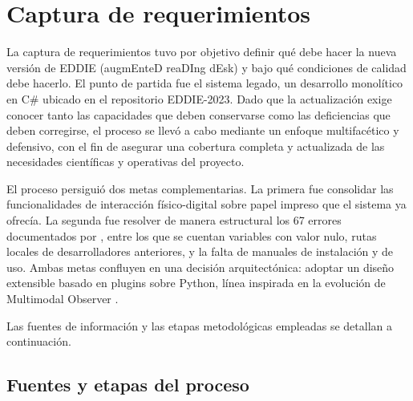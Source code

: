 \section{Captura de requerimientos}

La captura de requerimientos tuvo por objetivo definir qué debe hacer la nueva versión de EDDIE (augmEnteD reaDIng dEsk) y bajo qué condiciones de calidad debe hacerlo. El punto de partida fue el sistema legado, un desarrollo monolítico en C\# ubicado en el repositorio EDDIE-2023. Dado que la actualización exige conocer tanto las capacidades que deben conservarse como las deficiencias que deben corregirse, el proceso se llevó a cabo mediante un enfoque multifacético y defensivo, con el fin de asegurar una cobertura completa y actualizada de las necesidades científicas y operativas del proyecto.
 
El proceso persiguió dos metas complementarias. La primera fue consolidar las funcionalidades de interacción físico-digital sobre papel impreso que el sistema ya ofrecía. La segunda fue resolver de manera estructural los 67 errores documentados por \cite{ibaceta2023evaluacion}, entre los que se cuentan variables con valor nulo, rutas locales de desarrolladores anteriores, y la falta de manuales de instalación y de uso. Ambas metas confluyen en una decisión arquitectónica: adoptar un diseño extensible basado en plugins sobre Python, línea inspirada en la evolución de Multimodal Observer \citep{figueroa2025arquitectura}.
 
Las fuentes de información y las etapas metodológicas empleadas se detallan a continuación.
 
\subsection{Fuentes y etapas del proceso}
 
